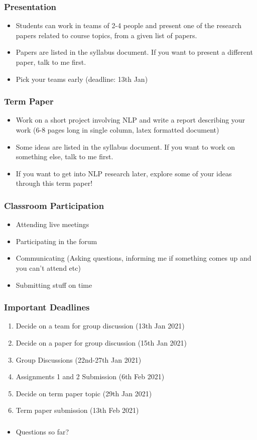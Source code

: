 \documentclass{beamer}
\begin{document}
\begin{frame}
\frametitle{Presentation}
\begin{itemize}
\item Students can work in teams of 2-4 people and present one of the research papers related to course topics, from a given list of papers.
\item Papers are listed in the syllabus document. If you want to present a different paper, talk to me first. 
\item Pick your teams early (deadline: 13th Jan)
\end{itemize}
\end{frame}

\begin{frame}
\frametitle{Term Paper}
\begin{itemize}
\item Work on a short project involving NLP and write  a report describing your work (6-8 pages long in single column, latex formatted document)
\item Some ideas are listed in the syllabus document. If you want to work on something else, talk to me first. 
\item If you want to get into NLP research later, explore some of your ideas through this term paper!
\end{itemize}
\end{frame}

\begin{frame}
\frametitle{Classroom Participation}
\begin{itemize}
\item Attending live meetings
\item Participating in the forum
\item Communicating (Asking questions, informing me if something comes up and you can't attend etc)
\item Submitting stuff on time
\end{itemize}
\end{frame}

\begin{frame}
\frametitle{Important Deadlines}
\begin{enumerate}
    \item Decide on a team for group discussion (13th Jan 2021)
    \item Decide on a paper for group discussion (15th Jan 2021)
    \item Group Discussions (22nd-27th Jan 2021)
    \item Assignments 1 and 2 Submission (6th Feb 2021)
    \item Decide on term paper topic (29th Jan 2021)
    \item Term paper submission (13th Feb 2021)
\end{enumerate}
\end{frame}

\begin{frame}
\frametitle{}
\begin{itemize}
    \item Questions so far?
\end{itemize}
\end{frame}
\end{document}
